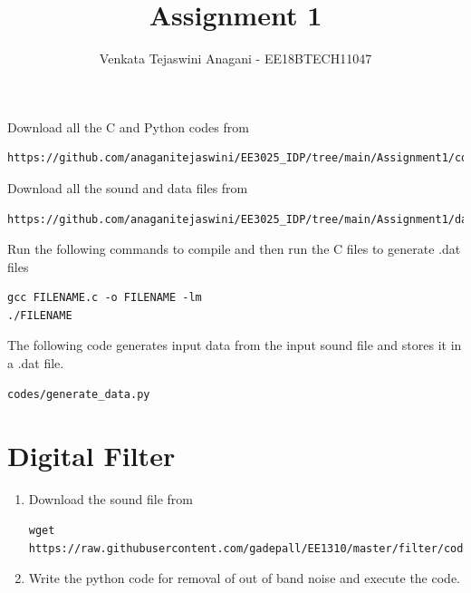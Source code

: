 \documentclass[journal,12pt,twocolumn]{IEEEtran}
\renewcommand\thesection{\arabic{section}}
\begin{document}
     \def\rightbox#1{\makebox[0in][r]{#1}}
     \def\centbox#1{\makebox[0in]{#1}}
     \def\topbox#1{\raisebox{-\baselineskip}[0in][0in]{#1}}
     \def\midbox#1{\raisebox{-0.5\baselineskip}[0in][0in]{#1}}
\vspace{3cm}
\title{Assignment 1}
\author{Venkata Tejaswini Anagani - EE18BTECH11047}
\maketitle
\newpage
\renewcommand{\thefigure}{\theenumi}
\renewcommand{\thetable}{\theenumi}
\bigskip
Download all the C and Python codes from 
\begin{lstlisting}
https://github.com/anaganitejaswini/EE3025_IDP/tree/main/Assignment1/codes
\end{lstlisting}
Download all the sound and data files from 
\begin{lstlisting}
https://github.com/anaganitejaswini/EE3025_IDP/tree/main/Assignment1/data
\end{lstlisting}
%
Run the following commands to compile and then run the C files to generate .dat files
\begin{lstlisting}
gcc FILENAME.c -o FILENAME -lm
./FILENAME
\end{lstlisting}
The following code generates input data from the input sound file and stores it in a .dat file.
\begin{lstlisting}
codes/generate_data.py
\end{lstlisting}
\section{Digital Filter}
\begin{enumerate}[label=\thesection.\arabic*
,ref=\thesection.\theenumi]
\item
\label{prob:input}
Download the sound file from  
\begin{lstlisting}
wget https://raw.githubusercontent.com/gadepall/EE1310/master/filter/codes/Sound_Noise.wav
\end{lstlisting}
\item
\label{prob:output}
Write the python code for removal of out of band noise and execute the code.
\\
\solution

\end{enumerate}
\end{document}
